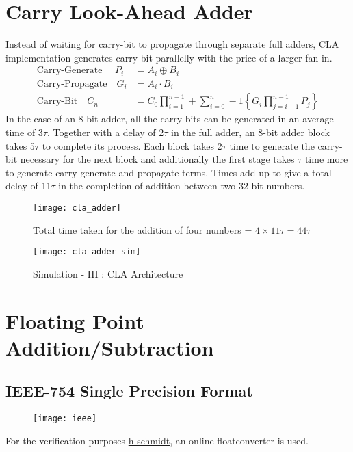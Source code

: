 \documentclass[11pt]{article}
\begin{document}
    \section{Carry Look-Ahead Adder}
    Instead of waiting for carry-bit to propagate through separate full adders, CLA implementation
    generates carry-bit parallelly with the price of a larger fan-in.
\vspace{-.25cm}
    \begin{align*}
        \text{Carry-Generate }\quad P_i &= A_i \oplus B_i\\
        \text{Carry-Propagate}\quad G_i &= A_i \cdot B_i\\
        \text{Carry-Bit} \quad  C_n &= C_0 \prod_{i=1}^{n-1}+\sum_{i=0}^n-1\left\{ G_i \prod_{j=i+1}^{n-1}P_j \right\}
    \end{align*}
    In the case of an 8-bit adder, all the carry bits can be generated in an average time of 3$\tau$.
    Together with a delay of 2$\tau$ in the full adder, an 8-bit adder block takes 5$\tau$ to complete
    its process.
    Each block takes 2$\tau$ time to generate the carry-bit necessary for the next block and additionally
    the first stage takes $\tau$ time more to generate carry generate and propagate terms. Times add up
    to give a total delay of 11$\tau$ in the completion of addition between two 32-bit numbers.
    \begin{figure}[h]
        \begin{center}
            \texttt{[image: cla\_adder]}
            \caption*{Total time taken for the addition of four numbers = $4\times 11\tau = 44\tau$}
            \texttt{[image: cla\_adder\_sim]}
            \caption*{Simulation - III : CLA Architecture}
        \end{center}
    \end{figure}


    \section{Floating Point Addition/Subtraction}

    \subsection{IEEE-754 Single Precision Format}
    \begin{figure}[h]
        \begin{center}
            \texttt{[image: ieee]}
        \end{center}
    \end{figure}
    For the verification purposes \href{https://www.h-schmidt.net/FloatConverter/IEEE754.html}{h-schmidt}, an online floatconverter is used.
\end{document}
